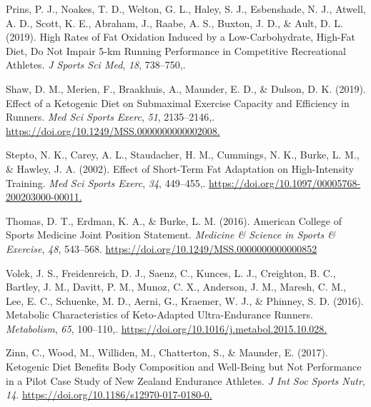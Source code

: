 \documentclass[]{cik}%
\newlength{\cslhangindent}
\newlength{\cslentryspacingunit} %
\newenvironment{CSLReferences}[2] %
 {%
  \setlength{\parindent}{0pt}
  \ifodd #1
  \let\oldpar\par
  \def\par{\hangindent=\cslhangindent\oldpar}
  \fi
  \setlength{\parskip}{#2\cslentryspacingunit}
 }%
 {}
\begin{document}
\begin{CSLReferences}{1}{0}
\leavevmode{}%
Prins, P. J., Noakes, T. D., Welton, G. L., Haley, S. J., Esbenshade, N.
J., Atwell, A. D., Scott, K. E., Abraham, J., Raabe, A. S., Buxton, J.
D., \& Ault, D. L. (2019). High Rates of Fat Oxidation Induced by a
Low-Carbohydrate, High-Fat Diet, Do Not Impair 5-km Running Performance
in Competitive Recreational Athletes. \emph{J Sports Sci Med},
\emph{18}, 738--750,.

\leavevmode{}%
Shaw, D. M., Merien, F., Braakhuis, A., Maunder, E. D., \& Dulson, D. K.
(2019). Effect of a Ketogenic Diet on Submaximal Exercise Capacity and
Efficiency in Runners. \emph{Med Sci Sports Exerc}, \emph{51},
2135--2146,. \url{https://doi.org/10.1249/MSS.0000000000002008.}

\leavevmode{}%
Stepto, N. K., Carey, A. L., Staudacher, H. M., Cummings, N. K., Burke,
L. M., \& Hawley, J. A. (2002). Effect of Short-Term Fat Adaptation on
High-Intensity Training. \emph{Med Sci Sports Exerc}, \emph{34},
449--455,. \url{https://doi.org/10.1097/00005768-200203000-00011.}

\leavevmode{}%
Thomas, D. T., Erdman, K. A., \& Burke, L. M. (2016). American College
of Sports Medicine Joint Position Statement. \emph{Medicine \& Science
in Sports \& Exercise}, \emph{48}, 543--568.
\url{https://doi.org/10.1249/MSS.0000000000000852}

\leavevmode{}%
Volek, J. S., Freidenreich, D. J., Saenz, C., Kunces, L. J., Creighton,
B. C., Bartley, J. M., Davitt, P. M., Munoz, C. X., Anderson, J. M.,
Maresh, C. M., Lee, E. C., Schuenke, M. D., Aerni, G., Kraemer, W. J.,
\& Phinney, S. D. (2016). Metabolic Characteristics of Keto-Adapted
Ultra-Endurance Runners. \emph{Metabolism}, \emph{65}, 100--110,.
\url{https://doi.org/10.1016/j.metabol.2015.10.028.}

\leavevmode{}%
Zinn, C., Wood, M., Williden, M., Chatterton, S., \& Maunder, E. (2017).
Ketogenic Diet Benefits Body Composition and Well-Being but Not
Performance in a Pilot Case Study of New Zealand Endurance Athletes.
\emph{J Int Soc Sports Nutr}, \emph{14}.
\url{https://doi.org/10.1186/s12970-017-0180-0.}

\end{CSLReferences}

%
%

%
%
%
%
\end{document}
